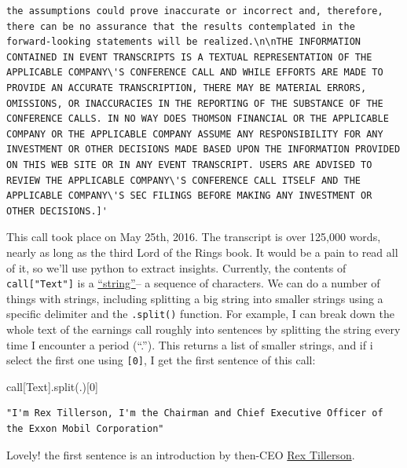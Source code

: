 \documentclass[
  letterpaper,
  DIV=11,
  numbers=noendperiod]{scrreprt}
\newenvironment{Shaded}{\begin{snugshade}}{\end{snugshade}}
\newcommand{\DecValTok}[1]{\textcolor[rgb]{0.68,0.00,0.00}{#1}}
\newcommand{\NormalTok}[1]{\textcolor[rgb]{0.00,0.23,0.31}{#1}}
\newcommand{\StringTok}[1]{\textcolor[rgb]{0.13,0.47,0.30}{#1}}
\begin{document}
\begin{verbatim}
the assumptions could prove inaccurate or incorrect and, therefore, there can be no assurance that the results contemplated in the forward-looking statements will be realized.\n\nTHE INFORMATION CONTAINED IN EVENT TRANSCRIPTS IS A TEXTUAL REPRESENTATION OF THE APPLICABLE COMPANY\'S CONFERENCE CALL AND WHILE EFFORTS ARE MADE TO PROVIDE AN ACCURATE TRANSCRIPTION, THERE MAY BE MATERIAL ERRORS, OMISSIONS, OR INACCURACIES IN THE REPORTING OF THE SUBSTANCE OF THE CONFERENCE CALLS. IN NO WAY DOES THOMSON FINANCIAL OR THE APPLICABLE COMPANY OR THE APPLICABLE COMPANY ASSUME ANY RESPONSIBILITY FOR ANY INVESTMENT OR OTHER DECISIONS MADE BASED UPON THE INFORMATION PROVIDED ON THIS WEB SITE OR IN ANY EVENT TRANSCRIPT. USERS ARE ADVISED TO REVIEW THE APPLICABLE COMPANY\'S CONFERENCE CALL ITSELF AND THE APPLICABLE COMPANY\'S SEC FILINGS BEFORE MAKING ANY INVESTMENT OR OTHER DECISIONS.]'
\end{verbatim}

This call took place on May 25th, 2016. The transcript is over 125,000
words, nearly as long as the third Lord of the Rings book. It would be a
pain to read all of it, so we'll use python to extract insights.
Currently, the contents of \texttt{call{[}"Text"{]}} is a
\href{https://docs.python.org/3/library/stdtypes.html\#text-sequence-type-str}{``string''}--
a sequence of characters. We can do a number of things with strings,
including splitting a big string into smaller strings using a specific
delimiter and the \texttt{.split()} function. For example, I can break
down the whole text of the earnings call roughly into sentences by
splitting the string every time I encounter a period (``.''). This
returns a list of smaller strings, and if i select the first one using
\texttt{{[}0{]}}, I get the first sentence of this call:

\begin{Shaded}
\begin{Highlighting}[]
\NormalTok{call[}\StringTok{\textquotesingle{}Text\textquotesingle{}}\NormalTok{].split(}\StringTok{\textquotesingle{}.\textquotesingle{}}\NormalTok{)[}\DecValTok{0}\NormalTok{]}
\end{Highlighting}
\end{Shaded}

\begin{verbatim}
"I'm Rex Tillerson, I'm the Chairman and Chief Executive Officer of the Exxon Mobil Corporation"
\end{verbatim}

Lovely! the first sentence is an introduction by then-CEO
\href{https://en.wikipedia.org/wiki/Rex_Tillerson}{Rex Tillerson}.
\end{document}
